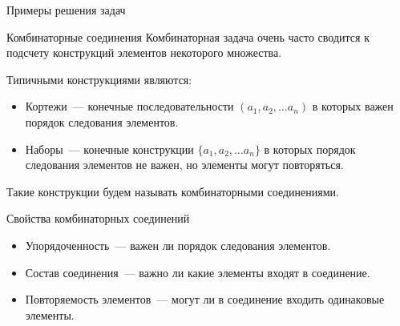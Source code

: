 \documentclass[unicode,11pt,notheorems,xcolor=table]{beamer}
\begin{document}
\begin{frame}{Примеры решения задач}
    
\end{frame}

\begin{frame}{Комбинаторные соединения}
    Комбинаторная задача очень часто сводится к подсчету конструкций элементов некоторого множества.
    
    \medskip
    Типичными конструкциями являются:
    \begin{itemize}
        \item \alert{Кортежи}~--- конечные последовательности $(a_1, a_2, \ldots a_n)$ в которых важен порядок следования элементов.
        \item \alert{Наборы}~--- конечные конструкции $\{a_1, a_2, \ldots a_n\}$ в которых порядок следования элементов не важен, но элементы могут повторяться.
    \end{itemize}
    
    \medskip
    Такие конструкции будем называть \alert{комбинаторными соединениями.}
\end{frame}

\begin{frame}{Свойства комбинаторных соединений}
    \begin{itemize}
        \item Упорядоченность~--- важен ли порядок следования элементов.
        \item Состав соединения~--- важно ли какие элементы входят в соединение.
        \item Повторяемость элементов~--- могут ли в соединение входить одинаковые элементы.
    \end{itemize}
    
\end{frame}
\end{document}
